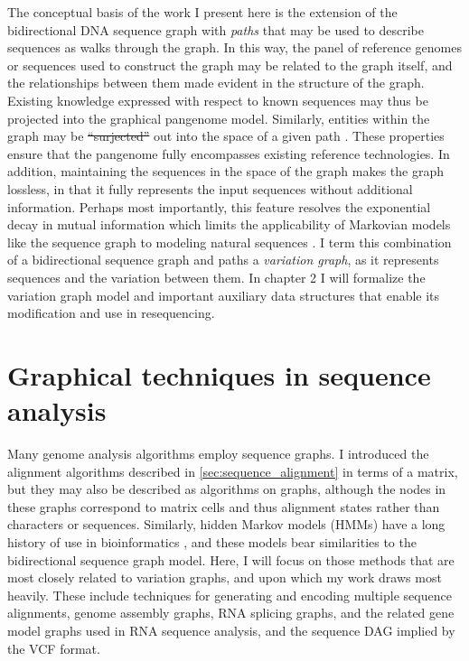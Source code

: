 \documentclass[a4paper,12pt,numbered,oneside]{Classes/PhDThesisPSnPDF}
\providecommand{\DIFaddtex}[1]{{\protect\color{blue}\uwave{#1}}} %
\providecommand{\DIFdeltex}[1]{{\protect\color{red}\sout{#1}}}                      %
\providecommand{\DIFaddbegin}{} %
\providecommand{\DIFaddend}{} %
\providecommand{\DIFdelbegin}{} %
\providecommand{\DIFdelend}{} %
\providecommand{\DIFadd}[1]{\texorpdfstring{\DIFaddtex{#1}}{#1}} %
\providecommand{\DIFdel}[1]{\texorpdfstring{\DIFdeltex{#1}}{}} %
\begin{document}
The conceptual basis of the work I present here is the extension of the bidirectional DNA sequence graph with \emph{paths} that may be used to describe sequences as walks through the graph.
In this way, the panel of reference genomes or sequences used to construct the graph may be related to the graph itself, and the relationships between them made evident in the structure of the graph.
Existing knowledge expressed with respect to known sequences may thus be projected into the graphical pangenome model.
Similarly, entities within the graph may be \DIFdelbegin \DIFdel{``surjected'' }\DIFdelend \DIFaddbegin \DIFadd{projected }\DIFaddend out into the space of a given path \DIFaddbegin \DIFadd{(as described in section \ref{sec:surjection})}\DIFaddend .
These properties ensure that the pangenome fully encompasses existing reference technologies.
In addition, maintaining the sequences in the space of the graph makes the graph lossless, in that it fully represents the input sequences without additional information.
Perhaps most importantly, this feature resolves the exponential decay in mutual information which limits the applicability of Markovian models like the sequence graph to modeling natural sequences \cite{lin2017critical}.
I term this combination of a bidirectional sequence graph and paths a \emph{variation graph}, as it represents sequences and the variation between them.
In chapter 2 I will formalize the variation graph model and important auxiliary data structures that enable its modification and use in resequencing.

\section{Graphical techniques in sequence analysis}
\DIFaddbegin \label{sec:graphical_techinques}
\DIFaddend 

Many genome analysis algorithms employ sequence graphs.
I introduced the alignment algorithms described in \ref{sec:sequence_alignment} in terms of a matrix, but they may also be described as algorithms on graphs, although the nodes in these graphs correspond to matrix cells and thus alignment states rather than characters or sequences.
Similarly, hidden Markov models (HMMs) have a long history of use in bioinformatics \cite{durbin1998biological}, and these models bear similarities to the bidirectional sequence graph model.
Here, I will focus on those methods that are most closely related to variation graphs, and upon which my work draws most heavily.
These include techniques for generating and encoding multiple sequence alignments, genome assembly graphs, RNA splicing graphs, and the related gene model graphs used in RNA sequence analysis, and the sequence DAG implied by the VCF format.
\end{document}
